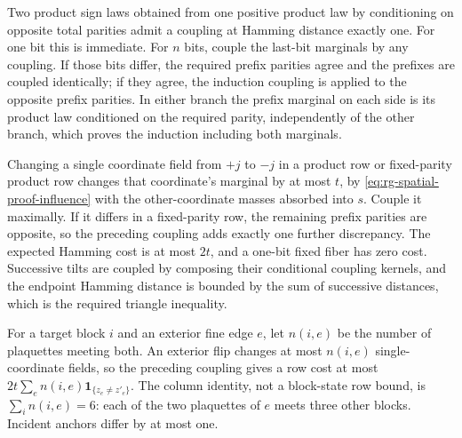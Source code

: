 Two product sign laws obtained from one positive product law by
conditioning on opposite total parities admit a coupling at Hamming
distance exactly one. For one bit this is immediate. For \(n\) bits, couple
the last-bit marginals by any coupling. If those bits differ, the required
prefix parities agree and the prefixes are coupled identically; if they
agree, the induction coupling is applied to the opposite prefix parities.
In either branch the prefix marginal on each side is its product law
conditioned on the required parity, independently of the other branch,
which proves the induction including both marginals.

Changing a single coordinate field from \(+j\) to \(-j\) in a product row
or fixed-parity product row changes that coordinate's marginal by at most
\(t\), by \cref{eq:rg-spatial-proof-influence} with the other-coordinate
masses absorbed into \(s\). Couple it maximally. If it differs in a
fixed-parity row, the remaining prefix parities are opposite, so the
preceding coupling adds exactly one further discrepancy. The expected
Hamming cost is at most \(2t\), and a one-bit fixed fiber has zero cost.
Successive tilts are coupled by composing their conditional coupling
kernels, and the endpoint Hamming distance is bounded by the sum of
successive distances, which is the required triangle inequality.

For a target block \(i\) and an exterior fine edge \(e\), let \(n(i,e)\) be
the number of plaquettes meeting both. An exterior flip changes at most
\(n(i,e)\) single-coordinate fields, so the preceding coupling gives a row
cost at most \(2t\sum_en(i,e)\mathbf1_{\{z_e\ne z'_e\}}\). The column
identity, not a block-state row bound, is \(\sum_in(i,e)=6\): each of the
two plaquettes of \(e\) meets three other blocks. Incident anchors differ
by at most one.

